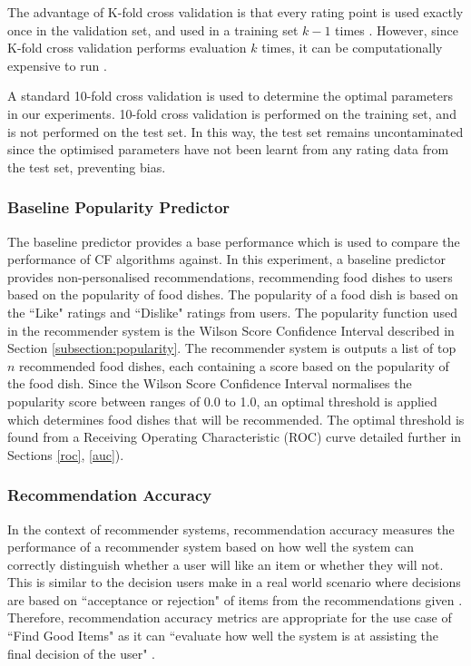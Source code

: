 The advantage of K-fold cross validation is that every rating point is used exactly once in the validation set, and used in a training set $k-1$ times \cite{kfold}. However, since K-fold cross validation performs evaluation $k$ times, it can be computationally expensive to run \cite{kfold}.

A standard 10-fold cross validation is used to determine the optimal parameters in our experiments. 10-fold cross validation is performed on the training set, and is not performed on the test set. In this way, the test set remains uncontaminated since the optimised parameters have not been learnt from any rating data from the test set, preventing bias.

\subsubsection{Baseline Popularity Predictor}

The baseline predictor provides a base performance which is used to compare the performance of CF algorithms against. In this experiment, a baseline predictor provides non-personalised recommendations, recommending food dishes to users based on the popularity of food dishes. The popularity of a food dish is based on the ``Like" ratings and ``Dislike" ratings from users. The popularity function used in the recommender system is the Wilson Score Confidence Interval described in Section \ref{subsection:popularity}. The recommender system is outputs a list of top $n$ recommended food dishes, each containing a score based on the popularity of the food dish. Since the Wilson Score Confidence Interval normalises the popularity score between ranges of 0.0 to 1.0, an optimal threshold is applied which determines food dishes that will be recommended. The optimal threshold is found from a Receiving Operating Characteristic (ROC) curve detailed further in Sections \ref{roc}, \ref{auc}).

\subsubsection{Recommendation Accuracy} \label{accuracy}

In the context of recommender systems, recommendation accuracy measures the performance of a recommender system based on how well the system can correctly distinguish whether a user will like an item or whether they will not. This is similar to the decision users make in a real world scenario where decisions are based on ``acceptance or rejection" of items from the recommendations given \cite{zhang}. Therefore, recommendation accuracy metrics are appropriate for the use case of ``Find Good Items" \cite{evaluation} as it can ``evaluate how well the system is at assisting the final decision of the user" \cite{zhang}. 

